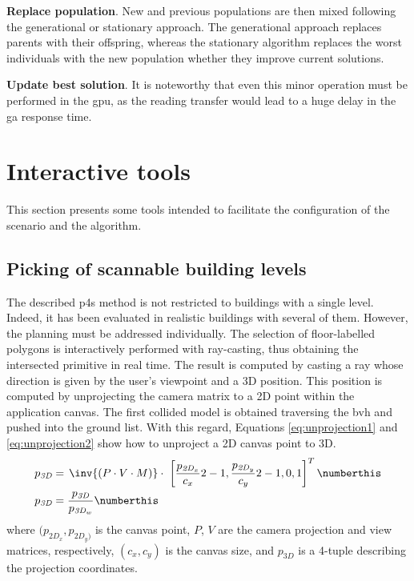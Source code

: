 \textbf{Replace population}. New and previous populations are then mixed following the generational or stationary approach. The generational approach replaces parents with their offspring, whereas the stationary algorithm replaces the worst individuals with the new population whether they improve current solutions.

\textbf{Update best solution}. It is noteworthy that even this minor operation must be performed in the \acrshort{gpu}, as the reading transfer would lead to a huge delay in the \acrshort{ga} response time.

\section{Interactive tools}

This section presents some tools intended to facilitate the configuration of the scenario and the algorithm.

\subsection{Picking of scannable building levels}

The described \acrshort{p4s} method is not restricted to buildings with a single level. Indeed, it has been evaluated in realistic buildings with several of them. However, the planning must be addressed individually. The selection of floor-labelled polygons is interactively performed with ray-casting, thus obtaining the intersected primitive in real time. The result is computed by casting a ray whose direction is given by the user's viewpoint and a 3D position. This position is computed by unprojecting the camera matrix to a 2D point within the application canvas. The first collided model is obtained traversing the \acrshort{bvh} and pushed into the ground list. With this regard, Equations \ref{eq:unprojection1} and \ref{eq:unprojection2} show how to unproject a 2D canvas point to 3D.
\begin{align*}
    p_{\textit{3D}} &= \hspace{.5mm} \inv{\left(P \cdot V \cdot M\right)} \cdot \hspace{1mm} \left[\frac{p_{\mathit{2D}_x}}{c_x}2 - 1,  \frac{p_{\mathit{2D}_y}}{c_y}2 - 1, 0, 1\right]^T
    \numberthis \label{eq:unprojection1}\\
    p_{\textit{3D}} &= \frac{p_{\textit{3D}}}{p_{\textit{3D}_w}}
    \numberthis \label{eq:unprojection2}
\end{align*}
where $(p_{\textit{2D}_x}, p_{\textit{2D}_y)}$ is the canvas point, $P$, $V$ are the camera projection and view matrices, respectively, $(c_x, c_y)$ is the canvas size, and $p_{\textit{3D}}$ is a 4-tuple describing the projection coordinates.

